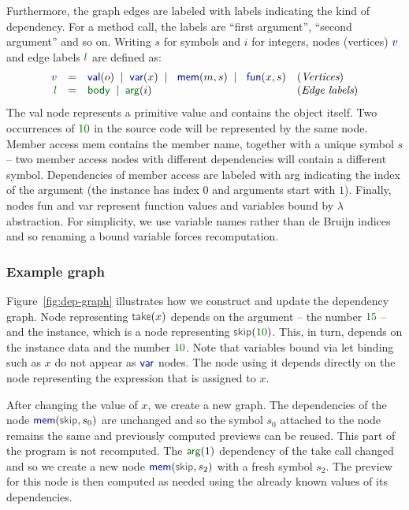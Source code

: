 \documentclass[acmsmall,anonymous,fleqn]{acmart}\settopmatter{printfolios=false,printccs=false,printacmref=false}
\theoremstyle{plain}
\theoremstyle{definition}
\newcommand{\lsep}{\;\;|\;\;}
\newcommand{\num}[1]{\textcolor{numclr}{#1}}
\newcommand{\ident}[1]{\textnormal{\textcolor{idclr}{\sffamily #1}}}
\newcommand{\kvd}[1]{\textnormal{\textcolor{kvdclr}{\sffamily #1}}}
\newcommand{\bndclr}[1]{\textcolor{kvdclr}{#1}}
\newcommand{\blblclr}[1]{\textcolor{numclr}{#1}}
\newcommand{\bnd}[1]{\textnormal{\textcolor{kvdclr}{\sffamily #1}}}
\newcommand{\blbl}[1]{\textnormal{\textcolor{numclr}{\sffamily #1}}}
\begin{document}
Furthermore, the graph edges are labeled with labels indicating the kind of dependency. For
a method call, the labels are ``first argument'', ``second argument'' and so on. Writing
$s$ for symbols and $i$ for integers, nodes (vertices) $\bndclr{v}$ and edge labels $\blblclr{l}$
are defined as:
%
\begin{equation*}
\begin{array}{rcll}
\bndclr{v}&=&\bnd{val}(o) \lsep \bnd{var}(x)\lsep \bnd{mem}(m, s)\lsep \bnd{fun}(x, s)&(\textit{Vertices})\\
\blblclr{l}&=&\blbl{body} \lsep \blbl{arg}(i)&(\textit{Edge labels})\\
\end{array}
\end{equation*}
%
The \bnd{val} node represents a primitive value and contains the object itself. Two occurrences
of $\num{10}$ in the source code will be represented by the same node. Member access \bnd{mem}
contains the member name, together with a unique symbol $s$ -- two member access nodes with
different dependencies will contain a different symbol. Dependencies of member access are labeled
with \blbl{arg} indicating the index of the argument (the instance has index $0$ and arguments
start with $1$). Finally, nodes \bnd{fun} and \bnd{var} represent function values and variables
bound by $\lambda$ abstraction. For simplicity, we use variable names rather than de Bruijn
indices and so renaming a bound variable forces recomputation.


\subsubsection{Example graph}
Figure~\ref{fig:dep-graph} illustrates how we construct and update the
dependency graph. Node representing $\ident{take}(x)$ depends on the argument -- the
number $\num{15}$ -- and the instance, which is a node representing $\ident{skip}(\num{10})$.
This, in turn, depends on the instance \ident{data} and the number $\num{10}$. Note that variables
bound via \kvd{let} binding such as $x$ do not appear as $\bnd{var}$ nodes. The node using it
depends directly on the node representing the expression that is assigned to $x$.

After changing the value of $x$, we create a new graph. The dependencies of the node
$\bnd{mem}(\ident{skip}, s_0)$ are unchanged and so the symbol $s_0$ attached to the node remains
the same and previously computed previews can be reused. This part of the program is not recomputed.
The $\blbl{arg}(1)$ dependency of the \ident{take} call
changed and so we create a new node $\bnd{mem}(\ident{skip}, s_2)$ with a fresh symbol $s_2$.
The preview for this node is then computed as needed using the already known values of its
dependencies.
\end{document}
